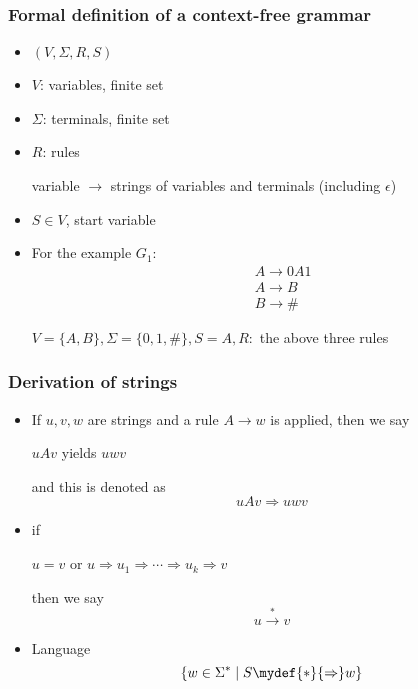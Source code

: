 \begin{frame}[allowframebreaks]
  \frametitle{Formal definition of a context-free
    grammar}
    \begin{itemize}
\item $(V,\Sigma, R, S)$

\item [] $V$: variables, finite set

\item [] $\Sigma$: terminals, finite set

\item [] $R$: rules
\begin{center}
  variable
$\rightarrow$ strings of variables and
terminals (including $\epsilon$)
\end{center}

\item $S\in V$, start variable

\item For the example $G_1$:
\begin{eqnarray*}
  && A \rightarrow 0A1\\
&& A \rightarrow B\\
&& B \rightarrow \#
\end{eqnarray*}

$V=\{A,B\}, \Sigma=\{0,1,\#\}, S = A, R:$
the above three rules
\end{itemize}
\end{frame}

\begin{frame}[allowframebreaks]
  \frametitle{Derivation of strings}
    \begin{itemize}
\item If $u,v,w$ are strings and a rule  $A \rightarrow
w$ is applied, then we say
\begin{center}
$uAv$ yields $uwv$
\end{center}
and this is denoted as
\begin{equation*}
uAv \Rightarrow uwv
\end{equation*}
\item if 
  \begin{center}
$u=v$ or 
$u \Rightarrow u_1 \Rightarrow \cdots \Rightarrow
u_k \Rightarrow v$
\end{center}
then we say
\begin{equation*}
u \xrightarrow{*} v 
\end{equation*}
\item Language
  \begin{equation*}
\{ w \in \Sigma^*\mid 
S \mydef{*}{\Rightarrow} w\}
\end{equation*}
\end{itemize}\end{frame} 

